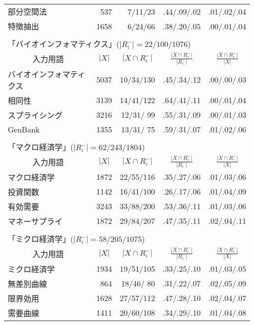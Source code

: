 \begin{table}
\begin{center}
\begin{tabular}{|l|rr|cc|}
    部分空間法 &  537 & 7/11/23 & .44/.09/.02 & .01/.02/.04\\
    特徴抽出 &  1658 & 6/24/66 & .38/.20/.05 & .00/.01/.04\\
    \hline
    \multicolumn{5}{l}{\tiny }\\[-5pt]
    \multicolumn{5}{l}{「バイオインフォマティクス」($|R_i^{-}|=22/100/1076$)} \\
    \hline
    \multicolumn{1}{|c}{入力用語} & 
    \multicolumn{1}{|c}{$|X|$} &
    \multicolumn{1}{c|}{$|X\cap R_i^{-}|$} &
    \multicolumn{1}{c}{$\frac{|X\cap R_i^{-}|}{|R_i^{-}|}$} &
    \multicolumn{1}{c|}{$\frac{|X\cap R_i^{-}|}{|X|}$}
    \\
    \hline
    {\footnotesize バイオインフォマティクス} & 5037 & 10/34/130 & 
    .45/.34/.12 & .00/.00/.03\\
    相同性  & 3139 & 14/41/122 & .64/.41/.11 & .00/.01/.04\\
    スプライシング &  3216 & 12/31/ 99 & .55/.31/.09 & .00/.01/.03\\
    GenBank &  1355 & 13/31/ 75 & .59/.31/.07 & .01/.02/.06\\
    \hline
    \multicolumn{5}{l}{\tiny }\\[-5pt]
    \multicolumn{5}{l}{「マクロ経済学」($|R_i^{-}|=62/243/1804$)} \\
    \hline
    \multicolumn{1}{|c}{入力用語} & 
    \multicolumn{1}{|c}{$|X|$} &
    \multicolumn{1}{c|}{$|X\cap R_i^{-}|$} &
    \multicolumn{1}{c}{$\frac{|X\cap R_i^{-}|}{|R_i^{-}|}$} &
    \multicolumn{1}{c|}{$\frac{|X\cap R_i^{-}|}{|X|}$}
    \\
    \hline
    マクロ経済学 &  1872 & 22/55/116 & .35/.27/.06 & .01/.03/.06\\
    投資関数 &  1142 & 16/41/100 & .26/.17/.06 & .01/.04/.09\\
    有効需要 &  3243 & 33/88/200 & .53/.36/.11 & .01/.03/.06\\
    マネーサプライ &  1872 & 29/84/207 & .47/.35/.11 & .02/.04/.11\\
    \hline
    \multicolumn{5}{l}{\tiny }\\[-5pt]
    \multicolumn{5}{l}{「ミクロ経済学」($|R_i^{-}|=58/205/1075$)} \\
    \hline
    \multicolumn{1}{|c}{入力用語} & 
    \multicolumn{1}{|c}{$|X|$} &
    \multicolumn{1}{c|}{$|X\cap R_i^{-}|$} &
    \multicolumn{1}{c}{$\frac{|X\cap R_i^{-}|}{|R_i^{-}|}$} &
    \multicolumn{1}{c|}{$\frac{|X\cap R_i^{-}|}{|X|}$}
    \\
    \hline
    ミクロ経済学 &  1934 & 19/51/105 & .33/.25/.10 & .01/.03/.05\\
    無差別曲線 &  864 & 18/46/ 80 & .31/.22/.07 & .02/.05/.09\\
    限界効用 &  1628 & 27/57/112 & .47/.28/.10 & .02/.04/.07\\
    需要曲線 &  1411 & 20/60/108 & .34/.29/.10 & .01/.04/.08\\
    \hline
   \end{tabular}
 \end{center}
\end{table}


